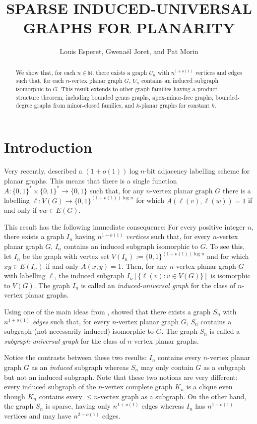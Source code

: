 \documentclass{patmorin}
\title{\MakeUppercase{Sparse Induced-Universal Graphs for Planarity}}
\author{Louis Esperet, Gwenaël Joret, and Pat Morin}
\newcommand{\N}{\mathbb{N}}
\begin{document}
\maketitle

\begin{abstract}
    We show that, for each $n\in\N$, there exists a graph $U_n$ with $n^{1+o(1)}$ vertices and edges such that, for each $n$-vertex planar graph $G$, $U_n$ contains an induced subgraph isomorphic to $G$.  This result extends to other graph families having a product structure theorem, including bounded genus graphs, apex-minor-free graphs, bounded-degree graphs from minor-closed families, and $k$-planar graphs for constant $k$.
\end{abstract}

\section{Introduction}

Very recently, \citet{dujmovic.esperet.ea:adjacency} described a $(1+o(1))\log n$-bit adjacency labelling scheme for planar graphs.  This means that there is a single function $A:\{0,1\}^*\times\{0,1\}^* \to\{0,1\}$ such that, for any $n$-vertex planar graph $G$ there is a labelling $\ell:V(G)\to\{0,1\}^{(1+o(1))\log n}$ for which $A(\ell(v),\ell(w))=1$ if and only if $vw\in E(G)$.

This result has the following immediate consequence: For every positive integer $n$, there exists a graph $I_n$ having $n^{1+o(1)}$ \emph{vertices} such that, for every $n$-vertex planar graph $G$, $I_n$ contains an induced subgraph isomorphic to $G$.  To see this, let $I_n$ be the graph with vertex set $V(I_n):=\{0,1\}^{(1+o(1))\log n}$ and for which $xy\in E(I_n)$ if and only $A(x,y)=1$.  Then, for any $n$-vertex planar graph $G$ with labelling $\ell$, the induced subgraph $I_n[\{\ell(v):v\in V(G)\}]$ is isomorphic to $V(G)$.  The graph $I_n$ is called an \emph{induced-universal graph} for the class of $n$-vertex planar graphs.

Using one of the main ideas from \cite{dujmovic.esperet.ea:adjacency}, \citet{esperet.joret.ea:sparse} showed that there exists a graph $S_n$ with $n^{1+o(1)}$ \emph{edges} such that, for every $n$-vertex planar graph $G$, $S_n$ contains a subgraph (not necessarily induced) isomorphic to $G$.  The graph $S_n$ is called a \emph{subgraph-universal graph} for the class of $n$-vertex planar graphs.

Notice the contrasts between these two results: $I_n$ contains every $n$-vertex planar graph $G$ as an \emph{induced} subgraph whereas $S_n$ may only contain $G$ as a subgraph but not an induced subgraph.  Note that these two notions are very different: every induced subgraph of the $n$-vertex complete graph $K_n$ is a clique even though $K_n$ contains every ${\le\! n}$-vertex graph as a subgraph. On the other hand, the graph $S_n$ is sparse, having only $n^{1+o(1)}$ edges whereas $I_n$ has $n^{1+o(1)}$ vertices and may have $n^{2+o(1)}$ edges.
\end{document}
